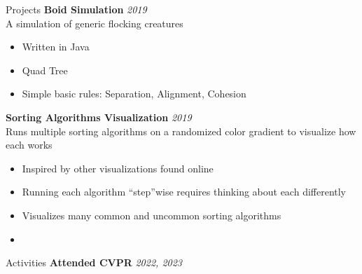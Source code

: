 \begin{rSection}{Projects}
		{\bf Boid Simulation}{} \hfill {\em 2019}\\
		A simulation of generic flocking creatures
		\begin{multicols}{2}
			\begin{itemize}
				\item Written in Java
				\item Quad Tree
				\item Simple basic rules: Separation, Alignment, Cohesion
			\end{itemize}
		\end{multicols}

		{\bf Sorting Algorithms Visualization}{} \hfill {\em 2019}\\
		Runs multiple sorting algorithms on a randomized color gradient to visualize how each works
		\begin{multicols}{2}
			\begin{itemize}
				\item Inspired by other visualizations found online
				\item Running each algorithm ``step''wise requires thinking about each differently
				\item Visualizes many common and uncommon sorting algorithms
				\item[\vspace{\fill}] %
			\end{itemize}
		\end{multicols}
	\end{rSection}
	
	\begin{rSection}{Activities}
		{\bf Attended CVPR} \hfill {\em 2022, 2023}
	\end{rSection}
	
